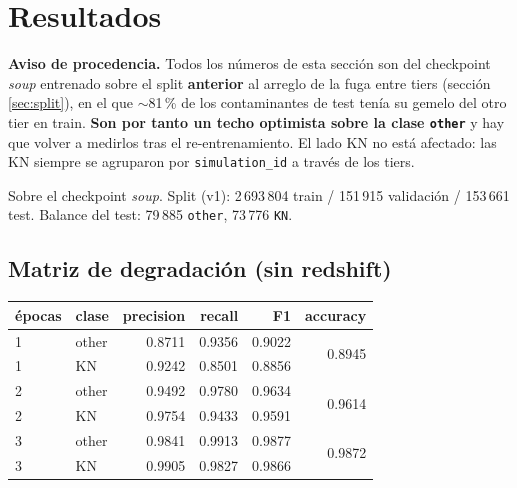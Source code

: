 \documentclass[11pt,a4paper]{article}
\newcommand{\code}[1]{\texttt{\small #1}}
\newlength{\examenpad}
\newenvironment{examen}
  {\par\medskip\noindent
   \begin{lrbox}{\examenbox}%
   \begin{minipage}{\dimexpr\linewidth-2\examenpad}\small}
  {\end{minipage}%
   \end{lrbox}%
   {\setlength{\fboxsep}{\examenpad}\colorbox{boxgray}{\usebox{\examenbox}}}%
   \par\medskip}
\begin{document}
\section{Resultados}
\label{sec:resultados}

\begin{examen}
\textbf{Aviso de procedencia.} Todos los números de esta sección son del checkpoint \emph{soup}
entrenado sobre el split \textbf{anterior} al arreglo de la fuga entre tiers (sección
\ref{sec:split}), en el que $\sim$81\,\% de los contaminantes de test tenía su gemelo del otro tier
en train. \textbf{Son por tanto un techo optimista sobre la clase \code{other}} y hay que volver a
medirlos tras el re-entrenamiento. El lado KN no está afectado: las KN siempre se agruparon por
\code{simulation\_id} a través de los tiers.
\end{examen}

Sobre el checkpoint \emph{soup}. Split (v1): 2\,693\,804 train / 151\,915 validación / 153\,661
test. Balance del test: 79\,885 \code{other}, 73\,776 \code{KN}.

\subsection{Matriz de degradación (sin redshift)}
\begin{center}
\begin{tabular}{llrrrr}
\toprule
épocas & clase & precision & recall & F1 & accuracy \\
\midrule
1 & other & 0.8711 & 0.9356 & 0.9022 & \multirow{2}{*}{0.8945} \\
1 & KN    & 0.9242 & 0.8501 & 0.8856 & \\
\midrule
2 & other & 0.9492 & 0.9780 & 0.9634 & \multirow{2}{*}{0.9614} \\
2 & KN    & 0.9754 & 0.9433 & 0.9591 & \\
\midrule
3 & other & 0.9841 & 0.9913 & 0.9877 & \multirow{2}{*}{0.9872} \\
3 & KN    & 0.9905 & 0.9827 & 0.9866 & \\
\bottomrule
\end{tabular}
\end{center}
\end{document}
